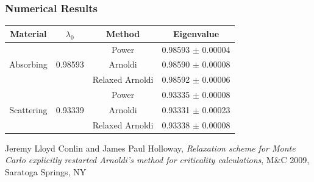\documentclass[color={usenames, dvipsnames},ignorenonframetext]{beamer}
\begin{document}
\begin{frame}
    \frametitle{Numerical Results}
\begin{table}
    \centering
    \begin{tabular}{cccc}
        \toprule
        Material & $\lambda_0$ & Method & Eigenvalue \\
        \midrule
        \multirow{3}{15mm}{Absorbing} & \multirow{3}{15mm}{0.98593} & Power & 0.98593 $\pm$ 0.00004 \\ %
        & & Arnoldi & 0.98590 $\pm$ 0.00008 \\ %
        & & Relaxed Arnoldi & 0.98592 $\pm$ 0.00006 \\ %
        \midrule
        \multirow{3}{15mm}{Scattering} & \multirow{3}{15mm}{0.93339} & Power & 0.93335 $\pm$ 0.00008 \\ %
        & & Arnoldi & 0.93331 $\pm$ 0.00023 \\ %
        & & Relaxed Arnoldi & 0.93338 $\pm$ 0.00008 \\ %
        \bottomrule
    \end{tabular}
\end{table}

    \vspace{2ex}
    {\scriptsize Jeremy Lloyd Conlin and James Paul Holloway, \emph{Relaxation scheme for Monte Carlo explicitly restarted Arnoldi's method for criticality calculations}, M\&C 2009, Saratoga Springs, NY}
\end{frame}
\end{document}
